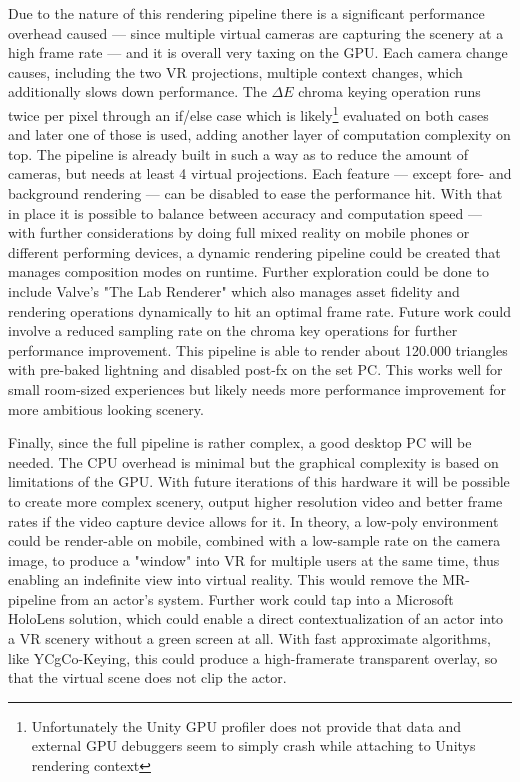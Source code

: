 Due to the nature of this rendering pipeline there is a significant performance 
overhead caused --- since multiple virtual cameras are capturing the scenery at 
a high frame rate --- and it is overall very taxing on the GPU. Each camera 
change causes, including the two VR projections, multiple context changes, 
which additionally slows down performance. The $\Delta E$ chroma keying 
operation runs twice per pixel through an if/else case which is 
likely\footnote{Unfortunately the Unity GPU profiler does not provide that 
data and external GPU debuggers seem to simply crash while attaching to Unitys 
rendering context} evaluated on both cases and later one of those is used, 
adding another layer of computation complexity on top. 
\newline
The pipeline is already built in such a way as to reduce the amount of cameras, 
but needs at least 4 virtual projections. Each feature --- except fore- and 
background  rendering --- can be disabled to ease the performance hit. With 
that in place it is possible to balance between accuracy and computation speed 
--- with further considerations by doing full mixed reality on mobile phones or 
different performing devices, a dynamic rendering pipeline could be created 
that manages composition modes on runtime. Further exploration could be done to 
include Valve's "The Lab Renderer" which also manages asset fidelity and 
rendering operations dynamically to hit an optimal frame rate. Future work 
could involve a reduced sampling rate on the chroma key operations for further 
performance improvement.
\newline
This pipeline is able to render about 120.000 triangles with pre-baked 
lightning and disabled post-fx on the set PC. This works well for small 
room-sized experiences but likely needs more performance improvement for 
more ambitious looking scenery.

Finally, since the full pipeline is rather complex, a good desktop PC will be 
needed. The CPU overhead is minimal but the graphical complexity is based on 
limitations of the GPU. With future iterations of this hardware it will be 
possible to create more complex scenery, output higher resolution video and 
better frame rates if the video capture device allows for it.
\newline
In theory, a low-poly environment could be render-able on mobile, combined with 
a low-sample rate on the camera image, to produce a "window" into VR for 
multiple users at the same time, thus enabling an indefinite view into virtual 
reality. This would remove the MR-pipeline from an actor's system. Further work 
could tap into a Microsoft HoloLens solution, which could enable a direct 
contextualization of an actor into a VR scenery without a green screen at all. 
With fast approximate algorithms, like YCgCo-Keying, this could produce a 
high-framerate transparent overlay, so that the virtual scene does not clip the 
actor.

